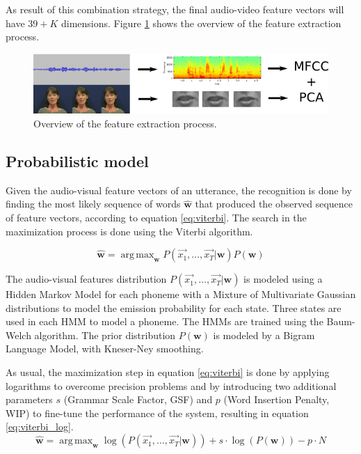 \documentclass[12pt,a4paper]{article}
\DeclareMathOperator*{\argmax}{arg\,max}
\begin{document}
As result of this combination strategy, the final audio-video feature vectors will have $39+K$ dimensions. Figure \ref{fig:feature_extraction} shows the overview of the feature extraction process.

\begin{figure}
\includegraphics[width=\textwidth]{multimodal_overview.png}
\caption{Overview of the feature extraction process.}
\label{fig:feature_extraction}
\end{figure}

\subsection{Probabilistic model}
Given the audio-visual feature vectors of an utterance, the recognition is done by finding the most likely sequence of words $\mathbf{\hat{w}}$ that produced the observed sequence of feature vectors, according to equation \ref{eq:viterbi}. The search in the maximization process is done using the Viterbi algorithm.

\begin{equation}\label{eq:viterbi}
\mathbf{\hat{w}} = \argmax_{\mathbf{w}} P(\vec{x_1}, \ldots, \vec{x_T}|\mathbf{w}) P(\mathbf{w})
\end{equation}

The audio-visual features distribution $P(\vec{x_1}, \ldots, \vec{x_T}|\mathbf{w})$ is modeled using a Hidden Markov Model for each phoneme with a Mixture of Multivariate Gaussian distributions to model the emission probability for each state. Three states are used in each HMM to model a phoneme. The HMMs are trained using the Baum-Welch algorithm. The prior distribution $P(\mathbf{w})$ is modeled by a Bigram Language Model, with Kneser-Ney smoothing.

As usual, the maximization step in equation \ref{eq:viterbi} is done by applying logarithms to overcome precision problems and by introducing two additional parameters $s$ (Grammar Scale Factor, GSF) and $p$ (Word Insertion Penalty, WIP) to fine-tune the performance of the system, resulting in equation \ref{eq:viterbi_log}.
\begin{equation}\label{eq:viterbi_log}
\mathbf{\hat{w}} = \argmax_{\mathbf{w}} \log(P(\vec{x_1}, \ldots, \vec{x_T}|\mathbf{w})) + s \cdot \log(P(\mathbf{w})) - p \cdot N
\end{equation}
\end{document}
